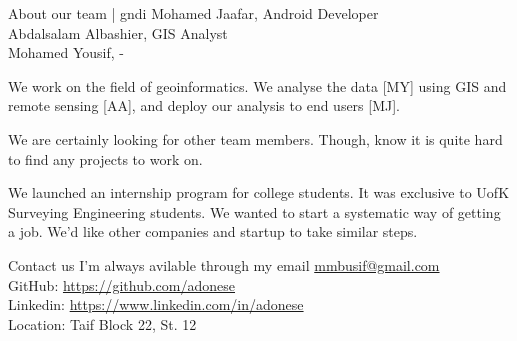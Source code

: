 \documentclass{beamer}
\begin{document}
\begin{frame}{About our team | gndi}
  Mohamed Jaafar, Android Developer\\
  Abdalsalam Albashier, GIS Analyst\\
  Mohamed Yousif, -

  We work on the field of geoinformatics. We analyse the data [MY] using GIS and
  remote sensing [AA], and deploy our analysis to end users [MJ].

  We are certainly looking for other team members. Though, know it is quite hard
  to find any projects to work on.

  We launched an internship program for college students. It was exclusive to
  UofK Surveying Engineering students. We wanted to start a systematic way of
  getting a job. We'd like other companies and startup to take similar steps.
\end{frame}

\begin{frame}{Contact us}
 I'm always avilable through my email
 \href{mailto:mmbusif@gmail.com}{mmbusif@gmail.com}\\
 GitHub: \href{https://github.com/adonese}{https://github.com/adonese}\\
 Linkedin:
 \href{https://www.linkedin.com/in/adonese}{https://www.linkedin.com/in/adonese}
 \\
 
 Location: Taif Block 22, St. 12
\end{frame}
\end{document}
